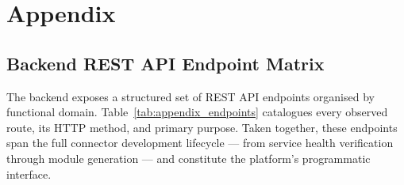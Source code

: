 \chapter{Appendix}

\section{Backend REST API Endpoint Matrix}

The backend exposes a structured set of REST API endpoints organised by functional domain. Table~\ref{tab:appendix_endpoints} catalogues every observed route, its HTTP method, and primary purpose. Taken together, these endpoints span the full connector development lifecycle --- from service health verification through module generation --- and constitute the platform's programmatic interface.

